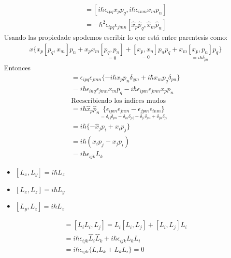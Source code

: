 \documentclass{article}
\begin{document}
\begin{gather*}
  [L_i, L_j ] = [i \hbar \epsilon _{ipq } x_p p_q, i \hbar \epsilon _{imn } x_m p _n ] \\
  = - \hbar ^2 \epsilon _{ipq } \epsilon _{jmn } [\hat x _p \hat p _q , \hat x _m \hat p _n ]
\end{gather*}
Usando las propiedade spodemos escribir lo que está entre parentesis como: 
\begin{gather*}
x\{x_p [p_q, x_m ] p_n + x_px_m \underset{=0}{[p_q,p_n ]} + \underset{ = 0 }{[x_p, x_n ]} p_n p_q + x_m\underset{= i \hbar \delta _{pn }}{[x_p,p_n]}p_q\}
\end{gather*}
Entonces 
\begin{gather*}
  [L_i,L_j] = \epsilon _{ipq }  \epsilon _{jmn } \{ - i \hbar  x_p p_n \delta _{qm }  + i \hbar x_m p_q \delta _{pn }  \} \\
  = i \hbar \epsilon _{inq }  \epsilon _{jmn } x _{m }  p _{q } - i \hbar  \epsilon _{ipm }  \epsilon _{jmn } x _{p } p _{n } \\
  \text{Reescribiendo los indices mudos }\\
  = i \hbar  \hat x_p \hat p _n \underset{ = \delta _{ij } \delta _{pn } - \delta _{in } \delta _{pj } - \delta _{ji }  \delta _{pn }  + \delta _{jn } \delta _{pi }  }{\{\epsilon _{ipm }  \epsilon _{jnm } - \epsilon _{jpm } \epsilon _{inm}  \}} \\
  = i \hbar \{- \hat x _j p_i + x_ip_j \} \\
  = i \hbar (x_i p_j - x_j p_i ) \\
  = i \hbar \epsilon _{ijk } L_k
\end{gather*}

\begin{itemize}
  \item $ [L_x,L_y] = i \hbar L_z $
  \item $ [L_x,L_z] = i \hbar L_y $
  \item $ [L_y,L_z] = i \hbar L_x $
\end{itemize}

\hfill 

\hfill 

\begin{gather*}
  [L^2, L_j ] = [L_iL_i, L_j ] = L_i[L_i,L_j] + [L_i,L_j]L_i\\
  = i \hbar \epsilon _{ijk } \hat L_i \hat L_k + i \hbar \epsilon _{ijk } L_k L_i\\
  = i \hbar \epsilon _{ijk } \{L_i L_k + L_k L_i \} = 0 
\end{gather*}
\end{document}
